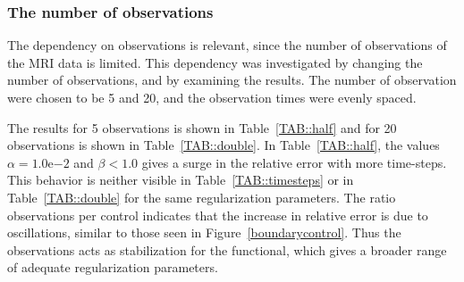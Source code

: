 \documentclass[12pt,a4paper]{article}
\begin{document}
\subsubsection{The number of observations}
The dependency on observations is relevant, since the number of observations of the MRI data is limited. This dependency was investigated by changing the number of observations, and by examining the results. The number of observation were chosen to be 5 and 20, and the observation times were evenly spaced. 

The results for 5 observations is shown in Table~\ref{TAB::half} and for 20 observations is shown in Table~\ref{TAB::double}. In Table~\ref{TAB::half}, the values $\alpha =1.0\mathrm{e}{-2}$ and $\beta<1.0$ gives a surge in the relative error with more time-steps. This behavior is neither visible in Table~\ref{TAB::timesteps} or in  Table~\ref{TAB::double} for the same regularization parameters. The ratio observations per control indicates that the increase in relative error is due to oscillations, similar to those seen in Figure~\ref{boundarycontrol}. Thus the observations acts as stabilization for the functional, which gives a broader range of adequate regularization parameters.
\end{document}
